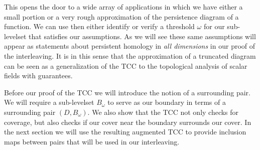 This opens the door to a wide array of applications in which we have either a small portion or a very rough approximation of the persistence diagram of a function.
We can use then either identify or verify a threshold $\omega$ for our sub-levelset that satisfies our assumptions.
As we will see these same assumptions will appear as statements about persistent homology in \emph{all dimensions} in our proof of the interleaving.
It is in this sense that the approximation of a truncated diagram can be seen as a generalization of the TCC to the topological analysis of scalar fields with guarantees.

Before our proof of the TCC we will introduce the notion of a surrounding pair.
We will require a sub-levelset $B_\omega$ to serve as our boundary in terms of a surrounding pair $(D, B_\omega)$.
We also show that the TCC not only checks for coverage, but also checks if our cover near the boundary surrounds our cover.
In the next section we will use the resulting augmented TCC to provide inclusion maps between pairs that will be used in our interleaving.
